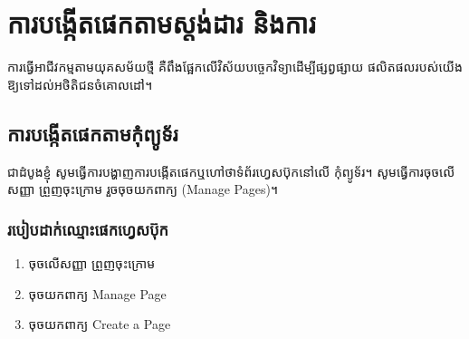 \chapter{ការបង្កើតផេកតាមស្តង់ដារ និងការ}
\quad\quad ការធ្វើអាជីវកម្មតាមយុគសម័យថ្មី គឺពឹងផ្អែកលើវិស័យបច្ចេកវិទ្យាដើម្បីផ្សព្វផ្សាយ ផលិតផលរបស់យើងឱ្យទៅដល់អថិតិជនចំគោលដៅ។ 
\section{ការបង្កើតផេកតាមកុំព្យូទ័រ}
\quad\quad ជាដំបូងខ្ញុំ សូមធ្វើការបង្ហាញការបង្កើតផេកឬហៅថាទំព័រហ្វេសប៊ុកនៅលើ កុំព្យូទ័រ។ សូមធ្វើការចុច​លើសញ្ញា ព្រួញចុះក្រោម រួចចុចយកពាក្យ {\en (Manage Pages)}។ 
\subsection{របៀបដាក់ឈ្មោះផេកហ្វេសប៊ុក}
\begin{enumerate}
	\item ចុចលើសញ្ញា ព្រួញចុះក្រោម
	\item ចុចយកពាក្យ {\en Manage Page}
	\item ចុចយកពាក្យ​ {\en Create a Page}
	\begin{figure}[H]
		\centering
	\end{figure}
\end{enumerate}